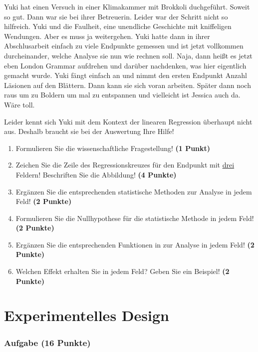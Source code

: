 \documentclass[a4paper, 9pt]{scrartcl}\usepackage[]{graphicx}\usepackage[]{xcolor}
\begin{document}
Yuki hat einen Versuch in einer Klimakammer mit Brokkoli duchgeführt. Soweit so gut. Dann war sie bei ihrer Betreuerin. Leider war der Schritt nicht so hilfreich.  Yuki und die Faulheit, eine unendliche Geschichte mit kniffeligen Wendungen. Aber es muss ja weitergehen. Yuki hatte dann in ihrer Abschlusarbeit einfach zu viele Endpunkte gemessen und ist jetzt vollkommen durcheinander, welche Analyse sie nun wie rechnen soll. Naja, dann heißt es jetzt eben London Grammar aufdrehen und darüber nachdenken, was hier eigentlich gemacht wurde. Yuki fängt einfach an und nimmt den ersten Endpunkt Anzahl Läsionen auf den Blättern. Dann kann sie sich voran arbeiten. Später dann noch raus um zu Boldern um mal zu entspannen und vielleicht ist Jessica auch da. Wäre toll.

\vspace{1Ex}

Leider kennt sich Yuki mit dem Kontext der linearen Regression überhaupt nicht aus. Deshalb braucht sie bei der Auswertung Ihre Hilfe!

\begin{enumerate}
  \item Formulieren Sie die wissenschaftliche Fragestellung! \textbf{(1 Punkt)}
\item Zeichen Sie die Zeile des Regressionskreuzes für den Endpunkt mit \underline{drei} Feldern! Beschriften Sie die Abbildung! \textbf{(4 Punkte)}
\item Ergänzen Sie die entsprechenden statistische Methoden zur Analyse in jedem Feld! \textbf{(2 Punkte)}
\item Formulieren Sie die Nullhypothese für die statistische Methode in jedem Feld! \textbf{(2 Punkte)}
\item Ergänzen Sie die entsprechenden Funktionen in \Rlogo zur Analyse in jedem Feld! \textbf{(2 Punkte)}
\item Welchen Effekt erhalten Sie in jedem Feld? Geben Sie ein Beispiel! \textbf{(2 Punkte)}
\end{enumerate} 
\clearpage
\part{Experimentelles Design}

\section{Aufgabe \hfill (16 Punkte)}
\end{document}
